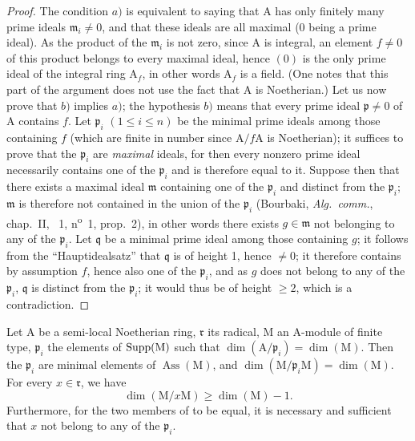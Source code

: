\begin{proof}
The condition $a)$ is equivalent to saying that $\mathrm{A}$ has only finitely many prime ideals $\mathfrak{m}_i\neq 0$, and that these ideals are all maximal (0 being a prime ideal).
As the product of the $\mathfrak{m}_i$ is not zero, since $\mathrm{A}$ is integral, an element $f\neq 0$ of this product belongs to every maximal ideal, hence $(0)$ is the only prime ideal of the integral ring $\mathrm{A}_f$, in other words $\mathrm{A}_f$ is a field.
(One notes that this part of the argument does not use the fact that $\mathrm{A}$ is Noetherian.)
Let us now prove that $b)$ implies $a)$; the hypothesis $b)$ means that every prime ideal $\mathfrak{p}\neq 0$ of $\mathrm{A}$ contains $f$.
Let $\mathfrak{p}_i$ $(1\leq i\leq n)$ be the minimal prime ideals among those containing $f$ (which are finite in number since $\mathrm{A}/f\mathrm{A}$ is Noetherian); it suffices to prove that the $\mathfrak{p}_i$ are \emph{maximal} ideals, for then every nonzero prime ideal necessarily contains one of the $\mathfrak{p}_i$ and is therefore equal to it.
Suppose then that there exists a maximal ideal $\mathfrak{m}$ containing one of the $\mathfrak{p}_i$ and distinct from the $\mathfrak{p}_i$; $\mathfrak{m}$ is therefore not contained in the union of the $\mathfrak{p}_i$ (Bourbaki, \emph{Alg.~comm.}, chap.~II, \textsection~1, n\textsuperscript{o}~1, prop.~2), in other words there exists $g\in\mathfrak{m}$ not belonging to any of the $\mathfrak{p}_i$.
Let $\mathfrak{q}$ be a minimal prime ideal among those containing $g$; it follows from the ``Hauptidealsatz''  that $\mathfrak{q}$ is of height 1, hence $\neq 0$; it therefore contains by assumption $f$, hence also one of the $\mathfrak{p}_i$, and as $g$ does not belong to any of the $\mathfrak{p}_i$, $\mathfrak{q}$ is distinct from the $\mathfrak{p}_i$; it would thus be of height $\geq 2$, which is a contradiction.
\end{proof}

\begin{proposition}[16.3.4]
\label{0.16.3.4}
Let $\mathrm{A}$ be a semi-local Noetherian ring, $\mathfrak{r}$ its radical, $\mathrm{M}$ an $\mathrm{A}$-module of finite type, $\mathfrak{p}_i$ the elements of $\operatorname{Supp}(\mathrm{M})$ such that $\dim(\mathrm{A}/\mathfrak{p}_i)=\dim(\mathrm{M})$.
Then the $\mathfrak{p}_i$ are minimal elements of $\operatorname{Ass}(\mathrm{M})$, and $\dim(\mathrm{M}/\mathfrak{p}_i\mathrm{M})=\dim(\mathrm{M})$.
For every $x\in\mathfrak{r}$, we have
\begin{equation}
\label{0.16.3.4.1}
\tag{16.3.4.1}
  \dim(\mathrm{M}/x\mathrm{M})\geq\dim(\mathrm{M})-1.
\end{equation}
Furthermore, for the two members of  to be equal, it is necessary and sufficient that $x$ not belong to any of the $\mathfrak{p}_i$.
\end{proposition}

